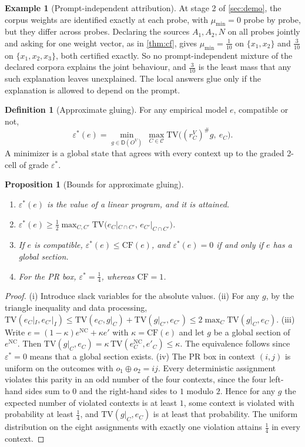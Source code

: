 \documentclass[11pt]{article}
\newtheorem{proposition}[theorem]{Proposition}
\theoremstyle{definition}
\newtheorem{definition}[theorem]{Definition}
\newtheorem{example}[theorem]{Example}
\theoremstyle{remark}
\newcommand{\D}{\mathsf{D}}
\newcommand{\TV}{\mathrm{TV}}
\begin{document}
\begin{example}[Prompt-independent attribution]\label{ex:global-attr}
At stage 2 of \cref{sec:demo}, the corpus weights are identified exactly at each probe, with
$\mu_{\min}=0$ probe by probe, but they differ across probes. Declaring the sources $A_1,A_2,N$
on all probes jointly and asking for one weight vector, as in \cref{thm:cf}, gives
$\mu_{\min}=\tfrac1{10}$ on $\{x_1,x_2\}$ and $\tfrac3{10}$ on $\{x_1,x_2,x_3\}$, both certified exactly.
So no prompt-independent mixture of the declared corpora explains the joint behaviour, and $\tfrac3{10}$
is the least mass that any such explanation leaves unexplained. The local answers glue only if the
explanation is allowed to depend on the prompt.
\end{example}

\begin{definition}[Approximate gluing]\label{def:epsstar}
For any empirical model $e$, compatible or not,
\[
\varepsilon^*(e)=\min_{g\in\D(O^V)}\ \max_{C\in\mathcal C}\TV\big((r^V_C)^\#g,\ e_C\big).
\]
A minimizer is a global state that agrees with every context up to the graded 2-cell of grade
$\varepsilon^*$.
\end{definition}

\begin{proposition}[Bounds for approximate gluing]\label{prop:epsstar}
\leavevmode
\begin{enumerate}[label=(\roman*)]
\item $\varepsilon^*(e)$ is the value of a linear program, and it is attained.
\item $\varepsilon^*(e)\ge\tfrac12\max_{C,C'}\TV\big(e_C|_{C\cap C'},\,e_{C'}|_{C\cap C'}\big)$.
\item If $e$ is compatible, $\varepsilon^*(e)\le\mathrm{CF}(e)$, and $\varepsilon^*(e)=0$ if and only if
  $e$ has a global section.
\item For the PR box, $\varepsilon^*=\tfrac14$, whereas $\mathrm{CF}=1$.
\end{enumerate}
\end{proposition}
\begin{proof}
(i) Introduce slack variables for the absolute values. (ii) For any $g$, by the triangle inequality and
data processing,
$\TV(e_C|_I,e_{C'}|_I)\le\TV(e_C,g|_C)+\TV(g|_{C'},e_{C'})\le2\max_C\TV(g|_C,e_C)$.
(iii) Write $e=(1-\kappa)e^{\mathrm{NC}}+\kappa e'$ with $\kappa=\mathrm{CF}(e)$ and let $g$ be a global
section of $e^{\mathrm{NC}}$. Then $\TV(g|_C,e_C)=\kappa\,\TV(e^{\mathrm{NC}}_C,e'_C)\le\kappa$. The
equivalence follows since $\varepsilon^*=0$ means that a global section exists.
(iv) The PR box in context $(i,j)$ is uniform on the outcomes with $o_1\oplus o_2=ij$. Every deterministic
assignment violates this parity in an odd number of the four contexts, since the four left-hand
sides sum to $0$ and the right-hand sides to $1$ modulo $2$. Hence for any $g$ the expected number of
violated contexts is at least $1$, some context is violated with probability at least $\tfrac14$, and
$\TV(g|_C,e_C)$ is at least that probability. The uniform distribution on the eight assignments with
exactly one violation attains $\tfrac14$ in every context.
\end{proof}
\end{document}
